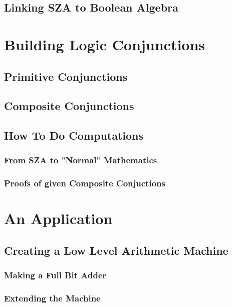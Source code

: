 \documentclass[12pt]{report}
\begin{document}
  \section{Linking SZA to Boolean Algebra}


\newpage

\chapter{Building Logic Conjunctions}
  \section{Primitive Conjunctions}

  \section{Composite Conjunctions}

  \section{How To Do Computations}
    \subsection{From SZA to "Normal" Mathematics}
    \subsection{Proofs of given Composite Conjuctions}

\newpage

\chapter{An Application}
  \section{Creating a Low Level Arithmetic Machine}
    \subsection{Making a Full Bit Adder}

    \subsection{Extending the Machine}
\end{document}
